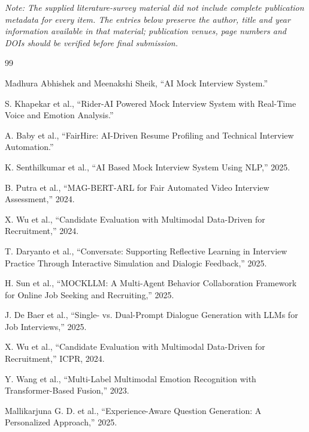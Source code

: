 \documentclass[12pt,a4paper,oneside]{report}
\begin{document}
\noindent\textit{Note: The supplied literature-survey material did not include complete publication metadata for every item. The entries below preserve the author, title and year information available in that material; publication venues, page numbers and DOIs should be verified before final submission.}
\begin{thebibliography}{99}

Madhura Abhishek and Meenakshi Sheik,
``AI Mock Interview System.''


S. Khapekar et al.,
``Rider-AI Powered Mock Interview System with Real-Time Voice and Emotion Analysis.''


A. Baby et al.,
``FairHire: AI-Driven Resume Profiling and Technical Interview Automation.''


K. Senthilkumar et al.,
``AI Based Mock Interview System Using NLP,'' 2025.

B. Putra et al.,
``MAG-BERT-ARL for Fair Automated Video Interview Assessment,'' 2024.

X. Wu et al.,
``Candidate Evaluation with Multimodal Data-Driven for Recruitment,'' 2024.

T. Daryanto et al.,
``Conversate: Supporting Reflective Learning in Interview Practice Through Interactive Simulation and Dialogic Feedback,'' 2025.

H. Sun et al.,
``MOCKLLM: A Multi-Agent Behavior Collaboration Framework for Online Job Seeking and Recruiting,'' 2025.

J. De Baer et al.,
``Single- vs. Dual-Prompt Dialogue Generation with LLMs for Job Interviews,'' 2025.

X. Wu et al.,
``Candidate Evaluation with Multimodal Data-Driven for Recruitment,'' ICPR, 2024.


Y. Wang et al.,
``Multi-Label Multimodal Emotion Recognition with Transformer-Based Fusion,'' 2023.

Mallikarjuna G. D. et al.,
``Experience-Aware Question Generation: A Personalized Approach,'' 2025.

\end{thebibliography}
\end{document}
